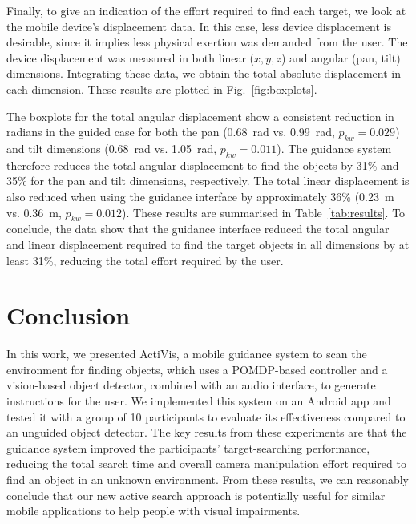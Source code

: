 \documentclass[runningheads]{llncs}
\DeclareRobustCommand{\tofix}[1]{{\sethlcolor{yellow}\hl{[#1]}}}
\begin{document}
Finally, to give an indication of the effort required to find each target, we look at the mobile device's displacement data. 
In this case, less device displacement is desirable, since it implies less physical exertion was demanded from the user.
%
The device displacement was measured in both linear ($x, y, z$) and angular (pan, tilt) dimensions.
Integrating these data, we obtain the total absolute displacement in each dimension.
These results are plotted in Fig.~\ref{fig:boxplots}.


The boxplots for the total angular displacement show a consistent reduction in radians in the guided case for both the pan (\SI{0.68}{\radian} vs. \SI{0.99}{\radian}, $p_{kw}=0.029$) and tilt dimensions (\SI{0.68}{\radian} vs. \SI{1.05}{\radian}, $p_{kw}=0.011$). 
The guidance system therefore reduces the total angular displacement to find the objects by 31\% and 35\% for the pan and tilt dimensions, respectively. 
The total linear displacement is also reduced when using the guidance interface by approximately 36\% (\SI{0.23}{\metre} vs. \SI{0.36}{\metre}, $p_{kw}=0.012$).
These results are summarised in Table~\ref{tab:results}.
To conclude, the data show that the guidance interface reduced the total angular and linear displacement required to find the target objects in all dimensions by at least 31\%, reducing the total effort required by the user. 


\section{Conclusion}\label{sec:conclusion}

In this work, we presented ActiVis, a mobile guidance system to scan the environment for finding objects, which uses a POMDP-based controller and a vision-based object detector, combined with an audio interface, to generate instructions for the user. 
We implemented this system on an Android app and tested it with a group of 10 participants to evaluate its effectiveness compared to an unguided object detector. 
The key results from these experiments are that the guidance system improved the participants' target-searching performance, reducing the total search time and overall camera manipulation effort required to find an object in an unknown environment.
From these results, we can reasonably conclude that our new active search approach is potentially useful for similar mobile applications to help people with visual impairments.
\end{document}
